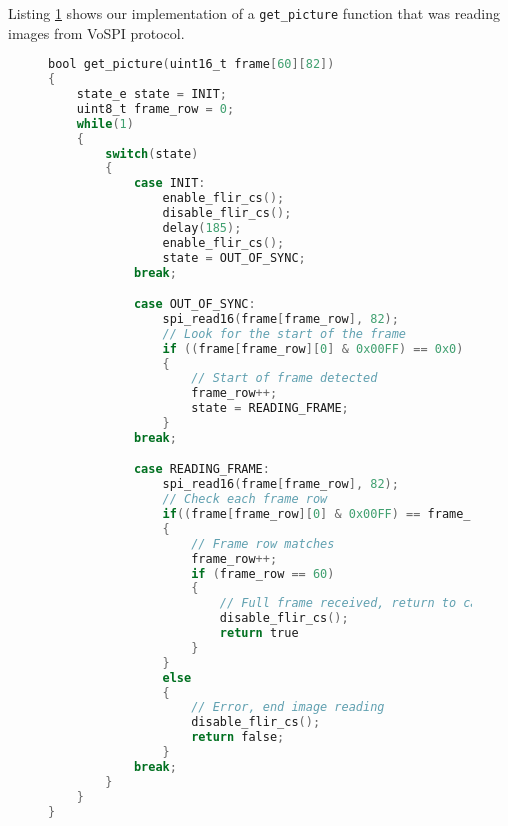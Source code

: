 Listing \ref{vospi_code} shows our implementation of a \verb|get_picture| function that was reading images from VoSPI protocol.
\clearpage
\lstset{style=mystyle}
\begin{figure}[ht]
\begin{lstlisting}[language=C]
bool get_picture(uint16_t frame[60][82])
{
    state_e state = INIT;
    uint8_t frame_row = 0;
    while(1) 
    {
        switch(state) 
        {
            case INIT:
                enable_flir_cs();
                disable_flir_cs();
                delay(185);
                enable_flir_cs();
                state = OUT_OF_SYNC;
            break;

            case OUT_OF_SYNC:
                spi_read16(frame[frame_row], 82);
                // Look for the start of the frame
                if ((frame[frame_row][0] & 0x00FF) == 0x0) 
                {
                    // Start of frame detected
                    frame_row++;
                    state = READING_FRAME;
                }
            break;

            case READING_FRAME:
                spi_read16(frame[frame_row], 82);
                // Check each frame row
                if((frame[frame_row][0] & 0x00FF) == frame_row) 
                {
                    // Frame row matches
                    frame_row++;
                    if (frame_row == 60) 
                    {
                        // Full frame received, return to caller
                        disable_flir_cs();
                        return true
                    }
                }
                else 
                {
                    // Error, end image reading
                    disable_flir_cs();
                    return false;
                }
            break;
        }
    }
}
\end{lstlisting}
\label{vospi_code}
\end{figure}
\clearpage

